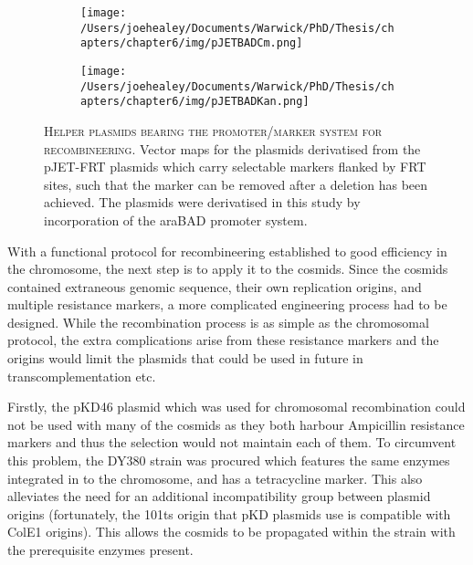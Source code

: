 \begin{figure}[p]
\centering
  \begin{subfigure}{\textwidth}
    \texttt{[image: /Users/joehealey/Documents/Warwick/PhD/Thesis/chapters/chapter6/img/pJETBADCm.png]}
    \captionsetup{singlelinecheck=off, justification=centering, font=footnotesize, aboveskip=10pt}
  \end{subfigure}
  
  \begin{subfigure}{\textwidth}
    \texttt{[image: /Users/joehealey/Documents/Warwick/PhD/Thesis/chapters/chapter6/img/pJETBADKan.png]}
    \captionsetup{singlelinecheck=off, justification=centering, font=footnotesize, aboveskip=10pt}
  \end{subfigure}
    
    \captionsetup{singlelinecheck=off, justification=justified, font=footnotesize, aboveskip=10pt}
    \caption[Cosmid recombineering helper plasmids created]{\textsc{\normalsize Helper plasmids bearing the promoter/marker system for recombineering.} \vspace{0.1cm} \newline Vector maps for the plasmids derivatised from the pJET-FRT plasmids which carry selectable markers flanked by FRT sites, such that the marker can be removed after a deletion has been achieved. The plasmids were derivatised in this study by incorporation of the araBAD promoter system.}
\label{helpermaps}
\end{figure}


With a functional protocol for recombineering established to good efficiency in the chromosome, the next step is to apply it to the cosmids. Since the cosmids contained extraneous genomic sequence, their own replication origins, and multiple resistance markers, a more complicated engineering process had to be designed. While the recombination process is as simple as the chromosomal protocol, the extra complications arise from these resistance markers and the origins would limit the plasmids that could be used in future in transcomplementation etc.

Firstly, the pKD46 plasmid which was used for chromosomal recombination could not be used with many of the cosmids as they both harbour Ampicillin resistance markers and thus the selection would not maintain each of them. To circumvent this problem, the DY380 strain was procured which features the same enzymes integrated in to the chromosome, and has a tetracycline marker. This also alleviates the need for an additional incompatibility group between plasmid origins (fortunately, the 101ts origin that pKD plasmids use is compatible with ColE1 origins). This allows the cosmids to be propagated within the strain with the prerequisite enzymes present.

